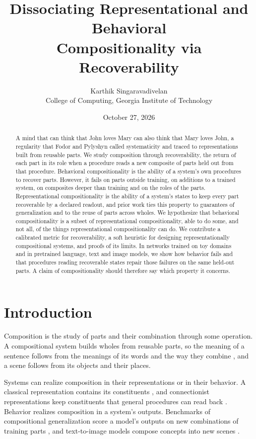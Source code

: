 \documentclass[10pt]{article}
\title{Dissociating Representational and Behavioral\\ Compositionality via Recoverability}
\author{Karthik Singaravadivelan\\ College of Computing, Georgia Institute of Technology}
\date{October 27, 2026}
\theoremstyle{plain}
\theoremstyle{remark}
\begin{document}
\maketitle

\begin{abstract}
A mind that can think that John loves Mary can also think that Mary loves John, a regularity that Fodor and Pylyshyn called systematicity and traced to representations built from reusable parts. We study composition through recoverability, the return of each part in its role when a procedure reads a new composite of parts held out from that procedure. Behavioral compositionality is the ability of a system's own procedures to recover parts. However, it fails on parts outside training, on additions to a trained system, on composites deeper than training and on the roles of the parts. Representational compositionality is the ability of a system's states to keep every part recoverable by a declared readout, and prior work ties this property to guarantees of generalization and to the reuse of parts across wholes. We hypothesize that behavioral compositionality is a subset of representational compositionality, able to do some, and not all, of the things representational compositionality can do. We contribute a calibrated metric for recoverability, a soft heuristic for designing representationally compositional systems, and proofs of its limits. In networks trained on toy domains and in pretrained language, text and image models, we show how behavior fails and that procedures reading recoverable states repair those failures on the same held-out parts. A claim of compositionality should therefore say which property it concerns.
\end{abstract}

\section{Introduction}
\label{sec:intro}

Composition is the study of parts and their combination through some operation. A compositional system builds wholes from reusable parts, so the meaning of a sentence follows from the meanings of its words and the way they combine \citep{frege1923,janssen1997}, and a scene follows from its objects and their places.

Systems can realize composition in their representations or in their behavior. A classical representation contains its constituents \citep{fodor1988}, and connectionist representations keep constituents that general procedures can read back \citep{hinton1990,smolensky1990,vangelder1990}. Behavior realizes composition in a system's outputs. Benchmarks of compositional generalization score a model's outputs on new combinations of training parts \citep{lake2018,keysers2020,hupkes2020}, and text-to-image models compose concepts into new scenes \citep{ramesh2021}.
\end{document}
